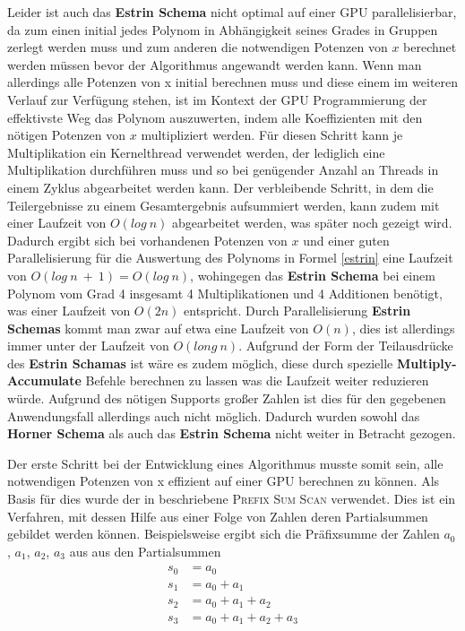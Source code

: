 Leider ist auch das \textbf{Estrin Schema} nicht optimal auf einer GPU parallelisierbar, da zum einen initial jedes Polynom in Abhängigkeit seines Grades in Gruppen zerlegt werden muss und zum anderen die notwendigen Potenzen von $x$ berechnet werden müssen bevor der Algorithmus angewandt werden kann. Wenn man allerdings alle Potenzen von x initial berechnen muss und diese einem im weiteren Verlauf zur Verfügung stehen, ist im Kontext der GPU Programmierung der effektivste Weg das Polynom auszuwerten, indem alle Koeffizienten mit den nötigen Potenzen von $x$ multipliziert werden. Für diesen Schritt kann je Multiplikation ein Kernelthread verwendet werden, der lediglich eine Multiplikation durchführen muss und so bei genügender Anzahl an Threads in einem Zyklus abgearbeitet werden kann. 
Der verbleibende Schritt, in dem die Teilergebnisse zu einem Gesamtergebnis aufsummiert werden, kann zudem mit einer Laufzeit von $O(log\ n)$ abgearbeitet werden, was später noch gezeigt wird.
Dadurch ergibt sich bei vorhandenen Potenzen von $x$ und einer guten Parallelisierung für die Auswertung des Polynoms in Formel \eqref{estrin} eine Laufzeit von $O(log\ n\ + \ 1) = O(log\ n)$, wohingegen das \textbf{Estrin Schema} bei einem Polynom vom Grad 4 insgesamt 4 Multiplikationen und 4 Additionen benötigt, was einer Laufzeit von $O(2n)$ entspricht. Durch Parallelisierung \textbf{Estrin Schemas} kommt man zwar auf etwa eine Laufzeit von $O(n)$, dies ist allerdings immer unter der Laufzeit von $O(long\ n)$. Aufgrund der Form der Teilausdrücke des \textbf{Estrin Schamas} ist wäre es zudem möglich, diese durch spezielle \textbf{Multiply-Accumulate} Befehle berechnen zu lassen was die Laufzeit weiter reduzieren würde. Aufgrund des nötigen Supports großer Zahlen ist dies für den gegebenen Anwendungsfall allerdings auch nicht möglich. Dadurch wurden sowohl das \textbf{Horner Schema} als auch das \textbf{Estrin Schema} nicht weiter in Betracht gezogen.\par

Der erste Schritt bei der Entwicklung eines Algorithmus musste somit sein, alle notwendigen Potenzen von x effizient auf einer GPU berechnen zu können. Als Basis für dies wurde der in \cite{Harris:2014} beschriebene \textsc{Prefix Sum Scan} verwendet. Dies ist ein Verfahren, mit dessen Hilfe aus einer Folge von Zahlen deren Partialsummen gebildet werden können. Beispielsweise ergibt sich die Präfixsumme der Zahlen $a_0$, $a_1$, $a_2$, $a_3$ aus aus den Partialsummen
\begin{align}\label{prefix_sum}
\begin{split}
s_0 &= a_0 \\
s_1 &= a_0 + a_1 \\
s_2 &= a_0 + a_1 + a_2 \\
s_3 &= a_0 + a_1 + a_2 + a_3
\end{split}
\end{align}


